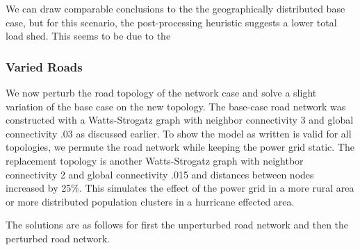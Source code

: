 \documentclass{article}
\begin{document}
	We can draw comparable conclusions to the the geographically distributed base case, but for this scenario, the post-processing heuristic suggests a lower total load shed. This seems to be due to the 
	\subsubsection{Varied Roads}
	We now perturb the road topology of the network case and solve a slight variation of the base case on the new topology. The base-case road network was constructed with a Watts-Strogatz graph with neighbor connectivity 3 and global connectivity .03 as discussed earlier. To show the model as written is valid for all topologies, we permute the road network while keeping the power grid static. The replacement topology is another Watts-Strogatz graph with neightbor connectivity 2 and global connectivity .015 and distances between nodes increased by 25\%. This simulates the effect of the power grid in a more rural area or more distributed population clusters in a hurricane effected area.
	
	The solutions are as follows for first the unperturbed road network and then the perturbed road network.
	
\end{document}
